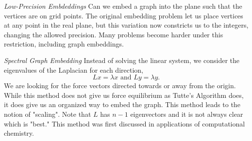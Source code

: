 \documentclass{article}
\begin{document}
    \medskip \noindent \textit{Low-Precision Embdeddings}
  \newline \noindent Can we embed a graph into the plane such that the vertices are on grid points. The original embedding problem let us place vertices at any point in the real plane, but this variation now constricts us to the integers, changing the allowed precision. Many problems become harder under this restriction, including graph embeddings. %
  
    \medskip \noindent \textit{Spectral Graph Embedding}
  \newline \noindent Instead of solving the linear system, we consider the eigenvalues of the Laplacian for each direction, $$Lx=\lambda x \text{ and } Ly=\lambda y.$$
  We are looking for the force vectors directed towards or away from the origin. While this method does not give us force equilibrium as Tutte's Algorithm does, it does give us an organized way to embed the graph. This method leads to the notion of "scaling". Note that $L$ has $n-1$ eigenvectors and it is not always clear which is "best." This method was first discussed in applications of computational chemistry.
\end{document}
